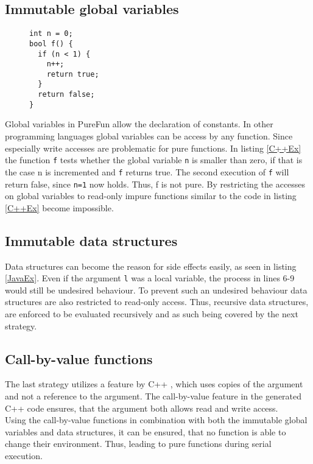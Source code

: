 \subsection{Immutable global variables}
\begin{figure}[h]
\begin{lstlisting}[caption={C++ code that uses a global variable.},label={C++Ex}]
int n = 0;
bool f() {
  if (n < 1) {
    n++;
    return true;
  }
  return false;
}
\end{lstlisting}
\end{figure}
Global variables in PureFun allow the declaration of constants. In other programming languages global variables can be access by any function. Since especially write accesses are problematic for pure functions. In listing \ref{C++Ex} the function \texttt{f} tests whether the global variable \texttt{n} is smaller than zero, if that is the case n is incremented and \texttt{f} returns true. The second execution of \texttt{f} will return false, since \texttt{n=1} now holds. Thus, f is not pure. By restricting the accesses on global variables to read-only impure functions similar to the code in listing \ref{C++Ex} become impossible.
\subsection{Immutable data structures}
Data structures can become the reason for side effects easily, as seen in listing \ref{JavaEx}. Even if the argument \texttt{l} was a local variable, the process in lines 6-9 would still be undesired behaviour. To prevent such an undesired behaviour data structures are also restricted to read-only access. Thus, recursive data structures, are enforced to be evaluated recursively and as such being covered by the next strategy.
\subsection{Call-by-value functions}
The last strategy utilizes a feature by C++ \cite{C++STD}, which uses copies of the argument and not a reference to the argument. The call-by-value feature in the generated C++ code ensures, that the argument both allows read and write access.\\
Using the call-by-value functions in combination with both the immutable global variables and data structures, it can be ensured, that no function is able to change their environment. Thus, leading to pure functions during serial execution.

